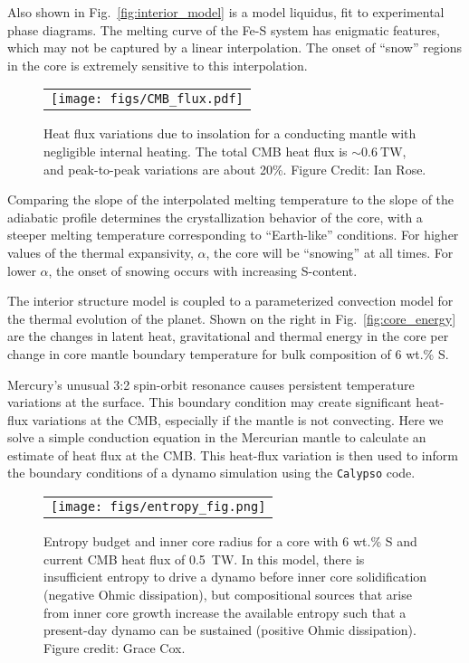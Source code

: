 Also shown in Fig.~\ref{fig:interior_model} is a model liquidus, fit to experimental
phase diagrams. The melting curve of the Fe-S system has enigmatic features, which
may not be captured by a  linear interpolation. The onset of ``snow''
regions in the core is extremely sensitive to this interpolation.


 \begin{figure}[h] %
   \centering
\begin{tabular}{c}
 \texttt{[image: figs/CMB\_flux.pdf]} 
\end{tabular}
\caption{ Heat flux variations due to insolation for a conducting mantle with
    negligible internal heating. The total CMB heat flux is $\sim 0.6~\mathrm{TW}$,
and peak-to-peak variations are about 20\%. Figure Credit: Ian Rose.}
\label{fig:flux}
\end{figure}


Comparing the slope of the interpolated melting temperature to the slope of the
adiabatic profile determines the crystallization behavior of the core, with a
steeper melting temperature corresponding to  ``Earth-like'' conditions. For higher
values of the thermal expansivity, $\alpha$, the core will be ``snowing'' at all
times. For lower $\alpha$, the onset of snowing occurs with increasing S-content.



The interior structure model is coupled to a parameterized convection model for
the thermal evolution of the planet. Shown on the right in Fig.~\ref{fig:core_energy}
are the changes in latent heat, gravitational and thermal energy in the core per
change in core mantle boundary temperature for bulk composition of 6 wt.\% S. 



Mercury's unusual 3:2 spin-orbit resonance causes persistent temperature variations
at the surface.  This boundary condition may create significant heat-flux variations
at the CMB, especially if the mantle is not convecting.  Here we solve a simple
conduction equation in the Mercurian mantle to calculate an estimate of heat flux at
the CMB.  This heat-flux variation is then used to inform the boundary conditions of
a dynamo simulation using the \texttt{Calypso} code.

 \begin{figure}[h] %
   \centering
\begin{tabular}{c}
 \texttt{[image: figs/entropy\_fig.png]} 
\end{tabular}
\caption{Entropy budget and inner core radius for a core with 6 wt.\% S and
  current CMB heat flux of 0.5~TW. In this model, there is insufficient entropy to
  drive a dynamo before inner core solidification (negative Ohmic dissipation), but
  compositional sources that arise from inner core growth increase the available
entropy such that a present-day dynamo can be sustained (positive Ohmic dissipation).
Figure credit: Grace Cox. }
\label{entropy}
\end{figure}
